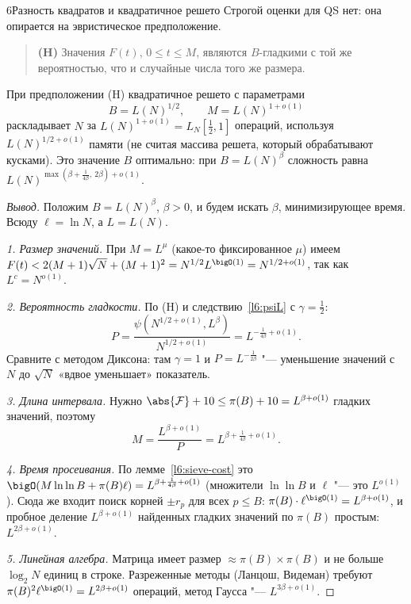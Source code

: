 \begin{lecture}{6}{Разность квадратов и квадратичное решето}
Строгой оценки для QS нет: она опирается на эвристическое предположение.

\begin{quote}
\textbf{(H)} Значения $F(t)$, $0 \le t \le M$, являются $B$-гладкими с той же вероятностью, что
и случайные числа того же размера.
\end{quote}

\begin{theorem}[эвристическая]\label{l6:qs-complexity}
При предположении (H) квадратичное решето с параметрами
\[
  B = L(N)^{1/2}, \qquad M = L(N)^{1 + o(1)}
\]
раскладывает $N$ за $L(N)^{1 + o(1)} = L_N[\frac12, 1]$ операций, используя
$L(N)^{1/2 + o(1)}$ памяти (не считая массива решета, который обрабатывают кусками). Это
значение $B$ оптимально: при $B = L(N)^{\beta}$ сложность равна
$L(N)^{\max(\beta + \frac{1}{4\beta},\ 2\beta) + o(1)}$.
\end{theorem}

\begin{proof}[Вывод]
Положим $B = L(N)^{\beta}$, $\beta > 0$, и будем искать $\beta$, минимизирующее время. Всюду
$\ell = \ln N$, а $L = L(N)$.

\emph{1. Размер значений.} При $M = L^{\mu}$ (какое-то фиксированное $\mu$) имеем
$F(t) < 2(M + 1)\sqrt N + (M + 1)^2 = N^{1/2} L^{\bigO(1)} = N^{1/2 + o(1)}$, так как $L^c = N^{o(1)}$.

\emph{2. Вероятность гладкости.} По (H) и следствию~\ref{l6:psiL} с $\gamma = \frac12$:
\[
  P = \frac{\psi(N^{1/2 + o(1)}, L^{\beta})}{N^{1/2 + o(1)}} = L^{-\frac{1}{4\beta} + o(1)}.
\]
Сравните с методом Диксона: там $\gamma = 1$ и $P = L^{-\frac{1}{2\beta}}$ "--- уменьшение
значений с $N$ до $\sqrt N$ «вдвое уменьшает» показатель.

\emph{3. Длина интервала.} Нужно $\abs{\mathcal F} + 10 \le \pi(B) + 10 = L^{\beta + o(1)}$
гладких значений, поэтому
\[
  M = \frac{L^{\beta + o(1)}}{P} = L^{\beta + \frac{1}{4\beta} + o(1)}.
\]

\emph{4. Время просеивания.} По лемме~\ref{l6:sieve-cost} это
$\bigO(M \ln\ln B + \pi(B)\ell) = L^{\beta + \frac{1}{4\beta} + o(1)}$
(множители $\ln\ln B$ и $\ell$ "--- это $L^{o(1)}$). Сюда же входит поиск корней $\pm r_p$ для
всех $p \le B$: $\pi(B) \cdot \ell^{\bigO(1)} = L^{\beta + o(1)}$, и пробное деление
$L^{\beta + o(1)}$ найденных гладких значений по $\pi(B)$ простым: $L^{2\beta + o(1)}$.

\emph{5. Линейная алгебра.} Матрица имеет размер $\approx \pi(B) \times \pi(B)$ и не больше
$\log_2 N$ единиц в строке. Разреженные методы (Ланцош, Видеман) требуют
$\pi(B)^{2} \ell^{\bigO(1)} = L^{2\beta + o(1)}$ операций, метод Гаусса "--- $L^{3\beta + o(1)}$.


\end{proof}
\end{lecture}
